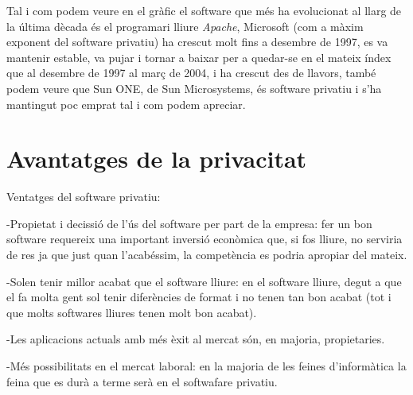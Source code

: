 Tal i com podem veure en el gràfic el software que més ha evolucionat al llarg de la 
última dècada és el programari lliure \emph{Apache}\cite{apache}, Microsoft (com a
màxim exponent del software privatiu) ha crescut molt fins a desembre de 1997, es va
mantenir estable, va pujar i tornar a baixar per a quedar-se en el mateix índex que al desembre de 1997 al març de 2004, i ha crescut des de llavors, també podem veure que Sun ONE, de Sun Microsystems, és software privatiu i s'ha mantingut poc emprat tal i com podem apreciar.\cite{tinet}

\section{Avantatges de la privacitat}

Ventatges del software privatiu: 

-Propietat i decissió de l'ús del software per part de la empresa: fer un bon software 
requereix una important inversió econòmica que, si fos lliure, no serviria de res ja 
que just quan l'acabéssim, la competència es podria apropiar del mateix.

-Solen tenir millor acabat que el software lliure: en el software lliure, degut a que
 el fa molta gent sol tenir diferències de format i no tenen tan bon acabat (tot i que
 molts softwares lliures tenen molt bon acabat).

-Les aplicacions actuals amb més èxit al mercat són, en majoria, propietaries.

-Més possibilitats en el mercat laboral: en la majoria de les feines d'informàtica la
feina que es durà a terme serà en el softwafare privatiu.
\cite{gentegeek}








